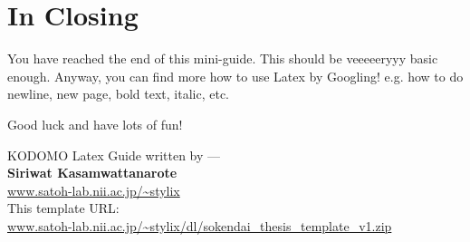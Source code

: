 \clearpage %


\section{In Closing}
\label{closing}
You have reached the end of this mini-guide. This should be veeeeeryyy basic enough. Anyway, you can find more how to use Latex by Googling! e.g. how to do newline, new page, bold text, italic, etc.

Good luck and have lots of fun!

\begin{flushright}
KODOMO Latex Guide written by ---\\
\textbf{Siriwat Kasamwattanarote}\\ \href{http://www.satoh-lab.nii.ac.jp/~stylix}{www.satoh-lab.nii.ac.jp/\textasciitilde stylix}\\
This template URL:\\ \href{http://www.satoh-lab.nii.ac.jp/~stylix/dl/sokendai_thesis_template_v1.zip}{www.satoh-lab.nii.ac.jp/\textasciitilde stylix/dl/sokendai\_thesis\_template\_v1.zip}
\end{flushright}